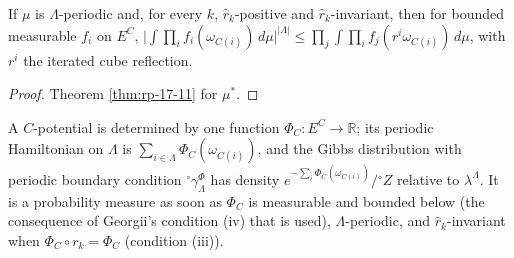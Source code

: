 \begin{corollary}[Georgii (17.17)]
    \label{cor:rp-17-17}
    \leanok

    If $\mu$ is $\Lambda$-periodic and, for every $k$, $\hat r_k$-positive and $\hat r_k$-invariant,
    then for bounded measurable $f_i$ on $E^C$,
    $\bigl|\int \prod_i f_i(\omega_{C(i)})\,d\mu\bigr|^{|\Lambda|} \leq
    \prod_j \int \prod_i f_j(r^i\omega_{C(i)})\,d\mu$, with $r^i$ the iterated cube reflection.
\end{corollary}
\begin{proof}
    \leanok
    Theorem \ref{thm:rp-17-11} for $\mu^*$.
\end{proof}

\begin{definition}
    \label{def:rp-17-18}
    \leanok

    A $C$-potential is determined by one function $\Phi_C : E^C \to \mathbb R$; its periodic
    Hamiltonian on $\Lambda$ is $\sum_{i \in \Lambda} \Phi_C(\omega_{C(i)})$, and the Gibbs
    distribution with periodic boundary condition ${}^\circ\gamma_\Lambda^\Phi$ has density
    $e^{-\sum_i \Phi_C(\omega_{C(i)})}/{}^\circ Z$ relative to $\lambda^\Lambda$. It is a
    probability measure as soon as $\Phi_C$ is measurable and bounded below (the consequence of
    Georgii's condition (iv) that is used), $\Lambda$-periodic, and $\hat r_k$-invariant when
    $\Phi_C \circ r_k = \Phi_C$ (condition (iii)).
\end{definition}


